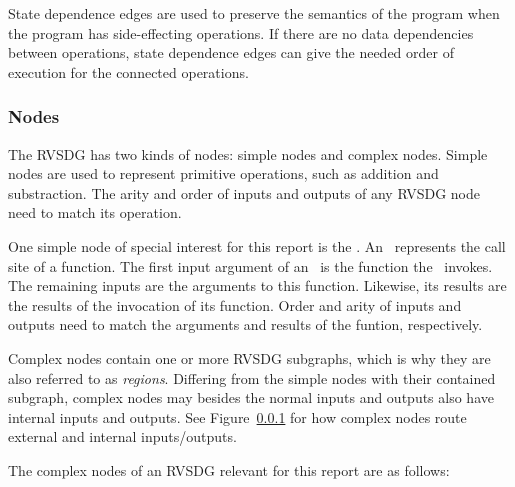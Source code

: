 State dependence edges are used to preserve the semantics of the program when
the program has side-effecting operations. If there are no data dependencies
between operations, state dependence edges can give the needed order of
execution for the connected operations.

\subsubsection{Nodes}

The RVSDG has two kinds of nodes: simple nodes and complex nodes. Simple nodes
are used to represent primitive operations, such as addition and substraction.
The arity and order of inputs and outputs of any RVSDG node need to match its
operation.

One simple node of special interest for this report is the \applyNode . An
\applyNode~represents the call site of a function. The first input argument of
an \applyNode~is the function the \applyNode~invokes. The remaining inputs are
the arguments to this function. Likewise, its results are the results of the
invocation of its function. Order and arity of inputs and outputs need to match
the arguments and results of the funtion, respectively.

Complex nodes contain one or more RVSDG subgraphs, which is why they are also
referred to as \textit{regions}. Differing from the simple nodes with their
contained subgraph, complex nodes may besides the normal inputs and outputs also
have internal inputs and outputs. See Figure~\ref{} for how complex nodes route
external and internal inputs/outputs.


The complex nodes of an RVSDG relevant for this report are as follows:

